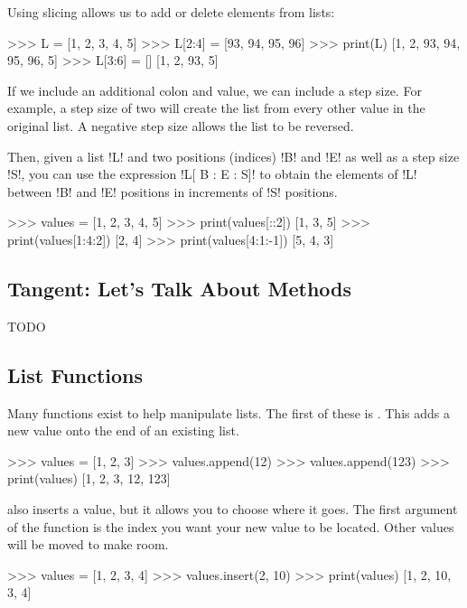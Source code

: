 \documentclass[11pt]{cselabheader}
\begin{document}
Using slicing allows us to add or delete elements from lists:

\begin{pyconcode}
>>> L = [1, 2, 3, 4, 5]
>>> L[2:4] = [93, 94, 95, 96]
>>> print(L)
[1, 2, 93, 94, 95, 96, 5]
>>> L[3:6] = []
[1, 2, 93, 5]
\end{pyconcode}

If we include an additional colon and value, we can include a step size. For
example, a step size of two will create the list from every other value in the
original list. A negative step size allows the list to be reversed.

Then, given a list \pythoninline!L! and two positions (indices) \pythoninline!B! and
\pythoninline!E! as well as a step size \pythoninline!S!, you can use the expression
\pythoninline!L[ B : E : S]! to obtain the elements of \pythoninline!L! between
\pythoninline!B! and \pythoninline!E! positions in increments of \pythoninline!S!
positions.

\begin{pyconcode}
>>> values = [1, 2, 3, 4, 5]
>>> print(values[::2])
[1, 3, 5]
>>> print(values[1:4:2])
[2, 4]
>>> print(values[4:1:-1])
[5, 4, 3]
\end{pyconcode}

\subsection{Tangent: Let's Talk About Methods}

TODO

\subsection{List Functions}
Many functions exist to help manipulate lists. The first of these is
. This adds a new value onto the end of an existing list.

\begin{pyconcode}
>>> values = [1, 2, 3]
>>> values.append(12)
>>> values.append(123)
>>> print(values)
[1, 2, 3, 12, 123]
\end{pyconcode}

 also inserts a value, but it allows you to choose where it
goes. The first argument of the function is the index you want your new value to
be located. Other values will be moved to make room.

\begin{pyconcode}
>>> values = [1, 2, 3, 4]
>>> values.insert(2, 10)
>>> print(values)
[1, 2, 10, 3, 4]
\end{pyconcode}
\end{document}
